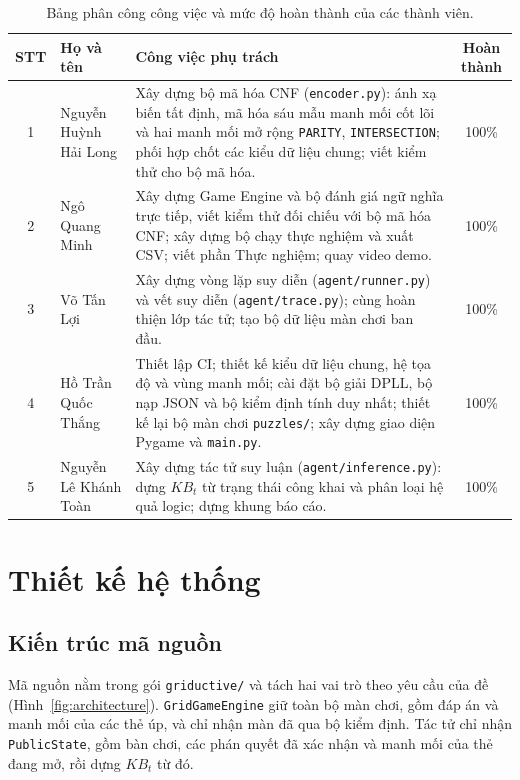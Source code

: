 \documentclass[12pt,a4paper]{article}
\begin{document}
\begin{table}[H]
\centering
\renewcommand{\arraystretch}{1.3}
\begin{tabular*}{\textwidth}{@{\extracolsep{\fill}}clp{}c@{}}
\toprule
\textbf{STT} & \textbf{Họ và tên} & \textbf{Công việc phụ trách} & \textbf{Hoàn thành} \\
\midrule
1 & Nguyễn Huỳnh Hải Long & Xây dựng bộ mã hóa CNF (\texttt{encoder.py}): ánh xạ biến tất định, mã hóa sáu mẫu manh mối cốt lõi và hai manh mối mở rộng \texttt{PARITY}, \texttt{INTERSECTION}; phối hợp chốt các kiểu dữ liệu chung; viết kiểm thử cho bộ mã hóa. & 100\% \\
2 & Ngô Quang Minh        & Xây dựng Game Engine và bộ đánh giá ngữ nghĩa trực tiếp, viết kiểm thử đối chiếu với bộ mã hóa CNF; xây dựng bộ chạy thực nghiệm và xuất CSV; viết phần Thực nghiệm; quay video demo. & 100\% \\
3 & Võ Tấn Lợi            & Xây dựng vòng lặp suy diễn (\texttt{agent/runner.py}) và vết suy diễn (\texttt{agent/trace.py}); cùng hoàn thiện lớp tác tử; tạo bộ dữ liệu màn chơi ban đầu. & 100\% \\
4 & Hồ Trần Quốc Thắng    & Thiết lập CI; thiết kế kiểu dữ liệu chung, hệ tọa độ và vùng manh mối; cài đặt bộ giải DPLL, bộ nạp JSON và bộ kiểm định tính duy nhất; thiết kế lại bộ màn chơi \texttt{puzzles/}; xây dựng giao diện Pygame và \texttt{main.py}. & 100\% \\
5 & Nguyễn Lê Khánh Toàn  & Xây dựng tác tử suy luận (\texttt{agent/inference.py}): dựng $KB_t$ từ trạng thái công khai và phân loại hệ quả logic; dựng khung báo cáo. & 100\% \\
\bottomrule
\end{tabular*}
\caption{Bảng phân công công việc và mức độ hoàn thành của các thành viên.}
\label{tab:task_distribution}
\end{table}

    \section{Thiết kế hệ thống}

    \subsection{Kiến trúc mã nguồn}
Mã nguồn nằm trong gói \texttt{griductive/} và tách hai vai trò theo yêu cầu của đề (Hình~\ref{fig:architecture}). \texttt{GridGameEngine} giữ toàn bộ màn chơi, gồm đáp án và manh mối của các thẻ úp, và chỉ nhận màn đã qua bộ kiểm định. Tác tử chỉ nhận \texttt{PublicState}, gồm bàn chơi, các phán quyết đã xác nhận và manh mối của thẻ đang mở, rồi dựng $KB_t$ từ đó.
\end{document}
